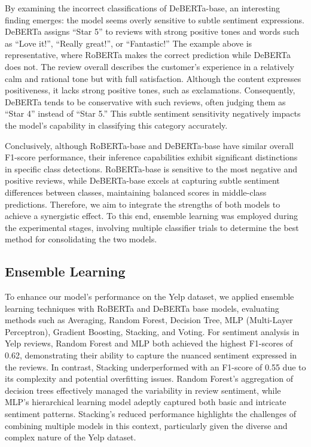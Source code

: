 \documentclass[11pt]{article}
\begin{document}
By examining the incorrect classifications of DeBERTa-base, an interesting finding emerges: the model seems overly sensitive to subtle sentiment expressions. DeBERTa assigns “Star 5” to reviews with strong positive tones and words such as “Love it!”, “Really great!”, or “Fantastic!” The example above is representative, where RoBERTa makes the correct prediction while DeBERTa does not. The review overall describes the customer’s experience in a relatively calm and rational tone but with full satisfaction. Although the content expresses positiveness, it lacks strong positive tones, such as exclamations. Consequently, DeBERTa tends to be conservative with such reviews, often judging them as “Star 4” instead of “Star 5.” This subtle sentiment sensitivity negatively impacts the model’s capability in classifying this category accurately.

Conclusively, although RoBERTa-base and DeBERTa-base have similar overall F1-score performance, their inference capabilities exhibit significant distinctions in specific class detections. RoBERTa-base is sensitive to the most negative and positive reviews, while DeBERTa-base excels at capturing subtle sentiment differences between classes, maintaining balanced scores in middle-class predictions. Therefore, we aim to integrate the strengths of both models to achieve a synergistic effect. To this end, ensemble learning was employed during the experimental stages, involving multiple classifier trials to determine the best method for consolidating the two models.

\subsection{Ensemble Learning}
To enhance our model's performance on the Yelp dataset, we applied ensemble learning techniques with RoBERTa and DeBERTa base models, evaluating methods such as Averaging, Random Forest, Decision Tree, MLP (Multi-Layer Perceptron), Gradient Boosting, Stacking, and Voting. For sentiment analysis in Yelp reviews, Random Forest and MLP both achieved the highest F1-scores of 0.62, demonstrating their ability to capture the nuanced sentiment expressed in the reviews. In contrast, Stacking underperformed with an F1-score of 0.55 due to its complexity and potential overfitting issues. Random Forest’s aggregation of decision trees effectively managed the variability in review sentiment, while MLP’s hierarchical learning model adeptly captured both basic and intricate sentiment patterns. Stacking's reduced performance highlights the challenges of combining multiple models in this context, particularly given the diverse and complex nature of the Yelp dataset.
\end{document}

